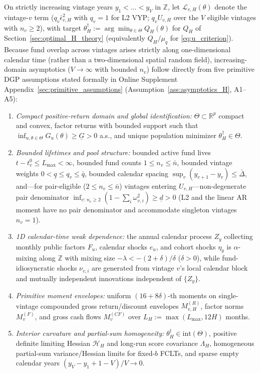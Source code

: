 \documentclass[12pt]{article}
\begin{document}
On strictly increasing vintage years $y_1 < \dots < y_V$ in $\mathbb{Z}$, let $\mathcal{L}_{v,H}(\theta)$ denote the vintage-$v$ term ($q_v\bar\epsilon_{v,H}^2$ with $q_v = 1$ for L2 VYP; $q_v U_{v,H}$ over the $V$ eligible vintages with $n_v \ge 2$), with target $\theta_H^\dagger := \arg\min_{\theta\in\Theta} Q_H(\theta)$ for $Q_H$ of Section~\ref{sec:optimal_H_theory} (equivalently $Q_H/\mu_q$ for \eqref{eq:u_criterion}).
Because fund overlap across vintages arises strictly along one-dimensional calendar time (rather than a two-dimensional spatial random field), increasing-domain asymptotics ($V \to \infty$ with bounded $n_v$) follow directly from five primitive DGP assumptions stated formally in Online Supplement Appendix~\ref{sec:primitive_assumptions} (Assumption~\ref{ass:asymptotics_H}, A1--A5):
\begin{enumerate}
  \item[\textbf{A1}] \emph{Compact positive-return domain and global identification:} $\Theta \subset \mathbb{R}^p$ compact and convex, factor returns with bounded support such that $\inf_{u,\theta\in\Theta} G_u(\theta) \ge \underline{G} > 0$ a.s., and unique population minimizer $\theta_H^\dagger \in \Theta$.
  \item[\textbf{A2}] \emph{Bounded lifetimes and pool structure:} bounded active fund lives $t - t_v^0 \le L_{\max} < \infty$, bounded fund counts $1 \le n_v \le \bar{n}$, bounded vintage weights $0 < \underline{q} \le q_v \le \bar{q}$, bounded calendar spacing $\sup_v(y_{v+1}-y_v) \le \bar{\Delta}$, and---for pair-eligible ($2 \le n_v \le \bar{n}$) vintages entering $U_{v,H}$---non-degenerate pair denominator $\inf_{v:\,n_v \ge 2}(1 - \sum_i \omega_{v,i}^2) \ge \underline{d} > 0$ (L2 and the linear AR moment have no pair denominator and accommodate singleton vintages $n_v = 1$).
  \item[\textbf{A3}] \emph{1D calendar-time weak dependence:} the annual calendar process $Z_y$ collecting monthly public factors $F_u$, calendar shocks $e_u$, and cohort shocks $\eta_y$ is $\alpha$-mixing along $\mathbb{Z}$ with mixing size $-\lambda < -(2+\delta)/\delta$ ($\delta > 0$), while fund-idiosyncratic shocks $\nu_{v,i}$ are generated from vintage $v$'s local calendar block and mutually independent innovations independent of $\{Z_y\}$.
  \item[\textbf{A4}] \emph{Primitive moment envelopes:} uniform $(16 + 8\delta)$-th moments on single-vintage compounded gross return/discount envelopes $M_{v,H}^{(R)}$, factor norms $M_v^{(F)}$, and gross cash flows $M_v^{(CF)}$ over $L_H := \max(L_{\max}, 12H)$ months.
  \item[\textbf{A5}] \emph{Interior curvature and partial-sum homogeneity:} $\theta_H^\dagger \in \mathrm{int}(\Theta)$, positive definite limiting Hessian $\mathcal{H}_H$ and long-run score covariance $\Lambda_H$, homogeneous partial-sum variance/Hessian limits for fixed-$b$ FCLTs, and sparse empty calendar years $(y_V - y_1 + 1 - V)/V \to 0$.
\end{enumerate}
\end{document}
